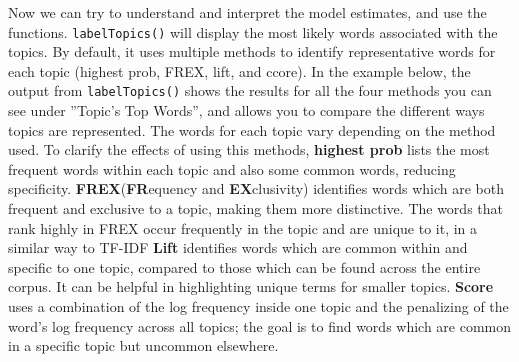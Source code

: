 Now we can try to understand and interpret the model estimates, and use the functions. \texttt{labelTopics()} will display the
most likely words associated with the topics. By default, it
uses multiple methods to identify representative words for each topic
(highest prob, FREX, lift, and ccore). In the example below, the output
from \texttt{labelTopics()} shows the results for all the four methods you
can see under ''Topic's Top Words'', and allows you to compare the
different ways topics are represented. The words for each topic
vary depending on the method used. To clarify the effects of using this
methods, \textbf{highest prob} lists the most frequent words within each
topic and also some common words, reducing specificity.
\textbf{FREX}(\textbf{FR}equency and \textbf{EX}clusivity) identifies
words which are both frequent and exclusive to a topic, making them more
distinctive. The words that rank highly in FREX occur frequently in the topic
and are unique to it, in a similar way to TF-IDF \textbf{Lift}
identifies words which are common within and specific to one topic, compared to those which can be found across
the entire corpus. It can be helpful in highlighting unique terms for smaller topics.
\textbf{Score} uses a combination of the log frequency inside one topic and the
penalizing of the word's log frequency across all topics; the goal is to
find words which are common in a specific topic but uncommon elsewhere.

\begin{Shaded}
\begin{Highlighting}[]
\OtherTok{\textless{}{-}} 
\end{Highlighting}
\end{Shaded}

